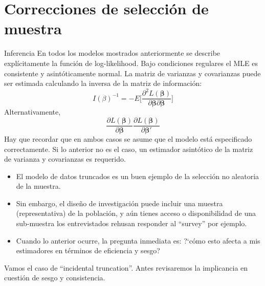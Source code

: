 \section[La muestra]{Correcciones de selección de muestra}

\begin{frame}{Inferencia}
	En todos los modelos mostrados anteriormente se describe explícitamente la función de log-likelihood. Bajo condiciones regulares el MLE es consistente y asintóticamente normal. La matriz de varianzas y covarianzas puede ser estimada calculando la inversa de la matriz de información:
		$$I(\beta)^{-1}=-E\Big[\frac{\partial^2 L(\boldsymbol{\beta})}{\partial \boldsymbol{\beta} \partial \boldsymbol{\beta}}\Big]$$
	Alternativamente,
		$$\frac{\partial L(\boldsymbol{\beta})}{\partial \boldsymbol{\beta}} \frac{\partial L(\boldsymbol{\beta})}{\partial \boldsymbol{\beta'}}$$
	Hay que recordar que en ambos casos se asume que el modelo está especificado correctamente. Si lo anterior no es el caso, un estimador asintótico de la matriz de varianza y covarianzas es requerido.
\end{frame}
\begin{frame}
	\begin{itemize}
		\item El modelo de datos truncados es un buen ejemplo de la selección no aleatoria de la muestra.
		\item Sin embargo, el dise\~no de investigación puede incluir una muestra (representativa) de la población, y a\'{u}n tienes acceso o disponibilidad de una sub-muestra \textendash los entrevistados rehusan responder al ``survey'' por ejemplo.
		\item Cuando lo anterior ocurre, la pregunta inmediata es: ?`cómo esto afecta a mis estimadores en t\'{e}rminos de eficiencia y sesgo?
	\end{itemize}
	Vamos el caso de ``incidental truncation''. Antes revisaremos la implicancia en cuestión de sesgo y consistencia.
\end{frame}

